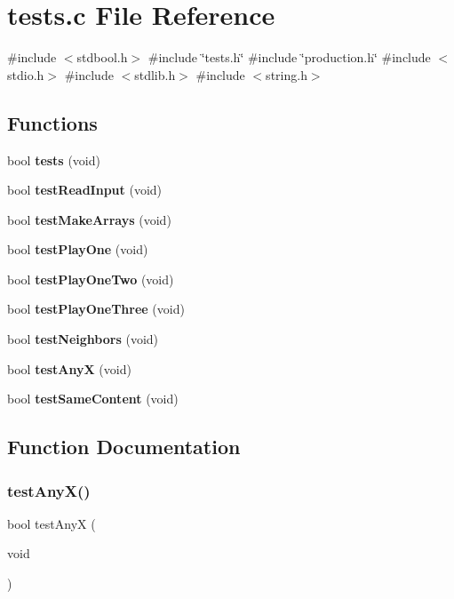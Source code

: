 \section{tests.\+c File Reference}
\label{tests_8c}
{\ttfamily \#include $<$stdbool.\+h$>$}\newline
{\ttfamily \#include \char`\"{}tests.\+h\char`\"{}}\newline
{\ttfamily \#include \char`\"{}production.\+h\char`\"{}}\newline
{\ttfamily \#include $<$stdio.\+h$>$}\newline
{\ttfamily \#include $<$stdlib.\+h$>$}\newline
{\ttfamily \#include $<$string.\+h$>$}\newline
\subsection*{Functions}
\begin{DoxyCompactItemize}
\item 
bool \textbf{ tests} (void)
\item 
bool \textbf{ test\+Read\+Input} (void)
\item 
bool \textbf{ test\+Make\+Arrays} (void)
\item 
bool \textbf{ test\+Play\+One} (void)
\item 
bool \textbf{ test\+Play\+One\+Two} (void)
\item 
bool \textbf{ test\+Play\+One\+Three} (void)
\item 
bool \textbf{ test\+Neighbors} (void)
\item 
bool \textbf{ test\+AnyX} (void)
\item 
bool \textbf{ test\+Same\+Content} (void)
\end{DoxyCompactItemize}


\subsection{Function Documentation}
\mbox{\label{tests_8c_a9136792bde961164c06bcdde7ab1d5f5}} 
\subsubsection{test\+Any\+X()}
{\footnotesize\ttfamily bool test\+AnyX (\begin{DoxyParamCaption}\item[{void}]{ }\end{DoxyParamCaption})}

